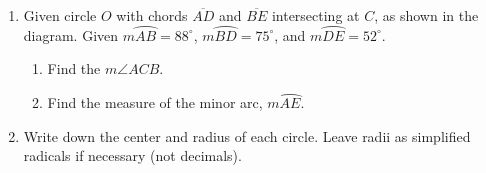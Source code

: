 \documentclass[12pt, twoside]{article}
\begin{document}
\begin{enumerate}
  \item Given circle $O$ with chords $\overline{AD}$ and $\overline{BE}$ intersecting at $C$, as shown in the diagram. Given $m \wideparen{AB}=88^\circ$, $m \wideparen{BD}=75^\circ$, and $m \wideparen{DE}=52^\circ$.
    \begin{multicols}{2}
     \raggedcolumns
     \begin{enumerate}
       \item Find the $m\angle ACB$. \vspace{3.5cm}
       \item Find the measure of the minor arc, $m\wideparen{AE}$. \vspace{2cm}
     \end{enumerate}
    \end{multicols}  \vspace{2cm}

  \item Write down the center and radius of each circle. Leave radii as simplified radicals if necessary (not decimals).
    \begin{enumerate}
    \end{enumerate}


\end{enumerate}
\end{document}
